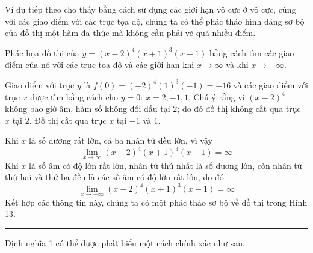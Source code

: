 \begin{minipage}[t]{375pt}
  \setlength{\abovedisplayskip}{5pt}
  \setlength{\belowdisplayskip}{5pt}
  Ví dụ tiếp theo cho thấy bằng cách sử dụng các giới hạn vô cực ở vô cực, cùng với các giao điểm với các trục tọa độ, chúng ta có thể phác thảo hình dáng sơ bộ của đồ thị một hàm đa thức mà không cần phải vẽ quá nhiều điểm.

  \vspace{0.8em}
  \hspace{0.8em}Phác họa đồ thị của $y = (x - 2)^4(x + 1)^3(x - 1)$ bằng cách tìm các giao điểm của nó với các trục tọa độ và các giới hạn khi $x \to \infty$ và khi $x \to -\infty$.

  \vspace{0.6em}
  \hspace{0.8em}Giao điểm với trục $y$ là $f(0) = (-2)^4(1)^3(-1) = -16$ và các giao điểm với trục $x$ được tìm bằng cách cho $y = 0$: $x = 2, -1, 1$. Chú ý rằng vì $(x - 2)^4$ không bao giờ âm, hàm số không đổi dấu tại $2$; do đó đồ thị không cắt qua trục $x$ tại $2$. Đồ thị cắt qua trục $x$ tại $-1$ và $1$.

  \vspace{0.5em}
  Khi $x$ là số dương rất lớn, cả ba nhân tử đều lớn, vì vậy
  \[
  \lim_{x \to \infty} (x - 2)^4(x + 1)^3(x - 1) = \infty
  \]
  Khi $x$ là số âm có độ lớn rất lớn, nhân tử thứ nhất là số dương lớn, còn nhân tử thứ hai và thứ ba đều là các số âm có độ lớn rất lớn, do đó
  \[
  \lim_{x \to -\infty} (x - 2)^4(x + 1)^3(x - 1) = \infty
  \]
  Kết hợp các thông tin này, chúng ta có một phác thảo sơ bộ về đồ thị trong Hình 13.\hfill{\color{stewartblue}\rule{1.1ex}{1.1ex}}

  \vspace{1.1em}
  \noindent{\color{stewartblue}\rule[0pt]{1.1ex}{1.1ex}}\par
  \vspace{0.4em}
  Định nghĩa 1 có thể được phát biểu một cách chính xác như sau.


\end{minipage}
